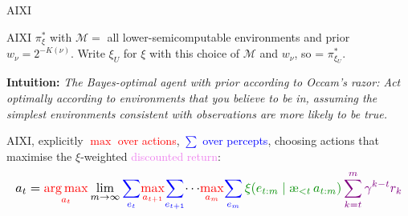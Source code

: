 \documentclass[10pt,aspectratio=169]{beamer}
\newcommand{\cM}{\mathcal{M}}
\DeclareMathOperator*{\argmax}{arg\,max}
\newcommand{\aes}{{\text{\ae}}}            %
\newcommand{\red}[1]{\textcolor{red}{#1}}
\newcommand{\blue}[1]{\textcolor{blue}{#1}}
\newcommand{\green}[1]{\textcolor{green!55!black}{#1}}
\newcommand{\purple}[1]{\textcolor{violet}{#1}}
\begin{document}
\begin{frame}{AIXI}
\begin{block}{AIXI}
$\pi_\xi^*$ with $\cM=$ all lower-semicomputable environments and prior $w_\nu = 2^{-K(\nu)}$.
Write $\xi_U$ for $\xi$ with this choice of $\cM$ and $w_\nu$, so  = $\pi_{\xi_U}^*$.
\end{block}
\textbf{Intuition:} \emph{The Bayes-optimal agent with prior according to Occam's razor: Act optimally according
to environments that you believe to be in, assuming the simplest environments consistent with
observations are more likely to be true.}
\pause
\begin{block}{AIXI, explicitly}
\red{$\max$ over actions}, \blue{$\sum$ over percepts}, choosing actions that maximise the \green{$\xi$-weighted} \purple{discounted return}:
\[
\resizebox{\linewidth}{!}{$\displaystyle
    a_t = \red{\argmax_{a_t}}\lim_{m\to\infty}
        \blue{\sum_{e_t}}\red{\max_{a_{t+1}}}\blue{\sum_{e_{t+1}}}\!\cdots\!
      \red{\max_{a_m}}\blue{\sum_{e_m}} \,
      \green{\xi(e_{t:m}\mid \aes_{<t}\,a_{t:m})} \, 
      \purple{\sum_{k=t}^m 
        \gamma^{k-t} r_k} 
$}
\]
\end{block}
\end{frame}

\end{document}
